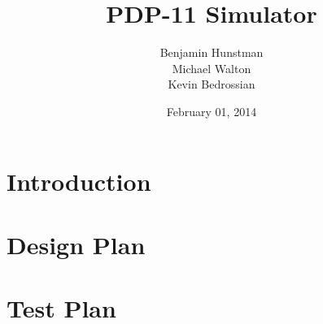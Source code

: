 \documentclass[]{report}   %
\begin{document}
\raggedright{}  %

\title{PDP-11 Simulator}   %
\author{Benjamin Hunstman \\
Michael Walton\\
Kevin Bedrossian}         %
\date{February 01, 2014}    %
\maketitle

\begin{abstract}
\end{abstract}

\tableofcontents

\chapter{Introduction}


\chapter{Design Plan}


\chapter{Test Plan}


\end{document}
